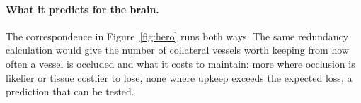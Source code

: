 \documentclass[letterpaper]{article} %
\begin{document}
\paragraph{What it predicts for the brain.} The correspondence in Figure~\ref{fig:hero} runs both ways. The same redundancy calculation would give the number of collateral vessels worth keeping from how often a vessel is occluded and what it costs to maintain: more where occlusion is likelier or tissue costlier to lose, none where upkeep exceeds the expected loss, a prediction that can be tested.




\end{document}
